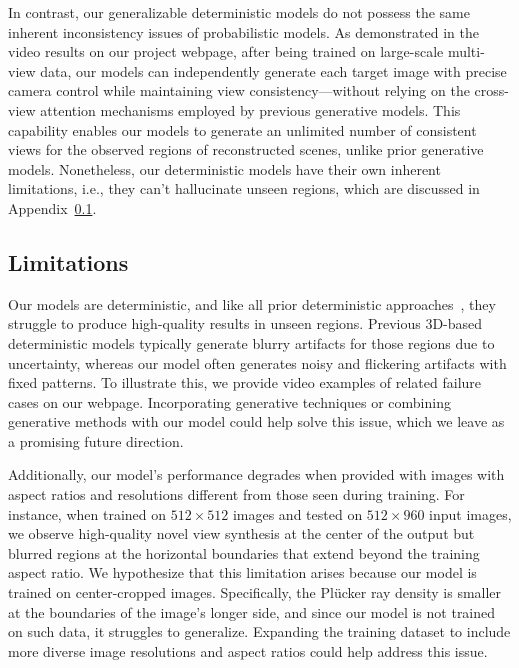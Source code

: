 In contrast, our generalizable deterministic models do not possess the same inherent inconsistency issues of probabilistic models. 
As demonstrated in the video results on our project webpage, after being trained on large-scale multi-view data, our models can independently generate each target image with precise camera control while maintaining view consistency---without relying on the cross-view attention mechanisms employed by previous generative models. 
This capability enables our models to generate an unlimited number of consistent views for the observed regions of reconstructed scenes, unlike prior generative models. 
Nonetheless, our deterministic models have their own inherent limitations, i.e., they can't hallucinate unseen regions, which are discussed in Appendix~\ref{appendix: limitation}.



\label{appendix: limitation}


\subsection{Limitations}
\label{appendix: limitation}

Our models are deterministic, and like all prior deterministic approaches~\citep{chen2021mvsnerffastgeneralizableradiance,wang2021ibrnetlearningmultiviewimagebased, sajjadi2022srt, wang2023pflrm,zhang2024gslrmlargereconstructionmodel}, they struggle to produce high-quality results in unseen regions. Previous 3D-based deterministic models typically generate blurry artifacts for those regions due to uncertainty, whereas our model often generates noisy and flickering artifacts with fixed patterns. To illustrate this, we provide video examples of related failure cases on our webpage. Incorporating generative techniques or combining generative methods with our model could help solve this issue, which we leave as a promising future direction.


Additionally, our model's performance degrades when provided with images with aspect ratios and resolutions different from those seen during training. For instance, when trained on $512 \times 512$ images and tested on $512 \times 960$ input images, we observe high-quality novel view synthesis at the center of the output but blurred regions at the horizontal boundaries that extend beyond the training aspect ratio. We hypothesize that this limitation arises because our model is trained on center-cropped images. Specifically, the Pl\"{u}cker ray density is smaller at the boundaries of the image's longer side, and since our model is not trained on such data, it struggles to generalize. Expanding the training dataset to include more diverse image resolutions and aspect ratios could help address this issue.
